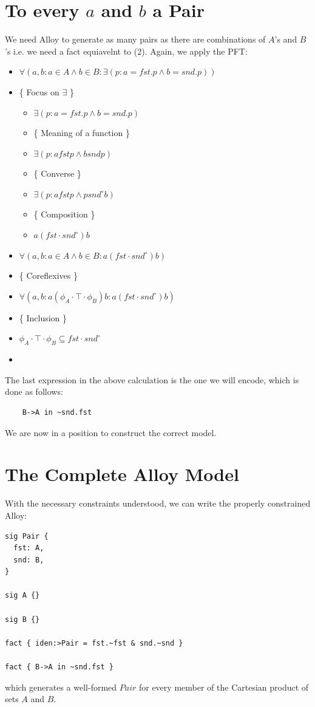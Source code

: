\documentclass{article}
\begin{document}
\section{To every $a$ and $b$ a Pair}
We need Alloy to generate as many pairs as there are combinations of $A$'s and $B$'s i.e. we need a fact equiavelnt to (2).  Again, we apply the PFT:
\renewcommand{\labelitemii}{\textbullet}
\begin{itemize}
    \item $\forall ( a,b : a \in A \wedge b \in B : \exists( p : a = fst.p \wedge b = snd.p ) )$
    \item[$\equiv$] \{ Focus on $\exists$ \}
    \begin{itemize}
        \item $\exists( p : a = fst.p \wedge b = snd.p )$
        \item[$\equiv$] \{ Meaning of a function \}
        \item[] $\exists( p : a \mathrel{fst} p \wedge b \mathrel{snd} p )$
        \item[$\equiv$] \{ Converse \}
        \item[] $\exists( p : a \mathrel{fst} p \wedge p \mathrel{snd^{\circ}} b )$
        \item[$\equiv$] \{ Composition \}
        \item[] $a(fst \cdot snd^{\circ})b$
    \end{itemize}
    \item[$\cdots$] $\forall ( a,b : a \in A \wedge b \in B : a(fst \cdot snd^{\circ})b )$
    \item[$\equiv$] \{ Coreflexives \}
    \item[] $\forall ( a,b : a(\phi_A \cdot \top \cdot\phi_B) b : a(fst \cdot snd^{\circ})b )$
    \item[$\equiv$] \{ Inclusion \}
    \item[] $\phi_A \cdot \top \cdot\phi_B \subseteq fst \cdot snd^{\circ}$
    \item[\Heart]
\end{itemize}
The last expression in the above calculation is the one we will encode,  which is done as follows:
\begin{verbatim}
    B->A in ~snd.fst
\end{verbatim}
We are now in a position to construct the correct model.

\section{The Complete Alloy Model}
With the necessary constraints understood, we can write the properly constrained Alloy:
\begin{verbatim}
sig Pair {
  fst: A,
  snd: B,
}

sig A {}

sig B {}

fact { iden:>Pair = fst.~fst & snd.~snd }

fact { B->A in ~snd.fst }
\end{verbatim}
which generates a well-formed $Pair$ for every member of the Cartesian product of sets $A$ and $B$.



\end{document}
